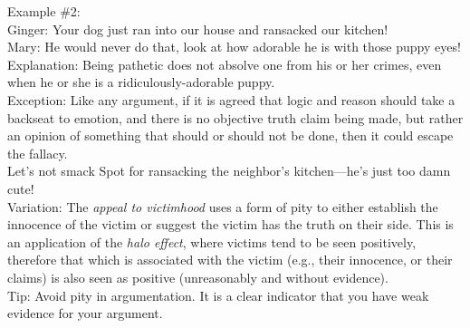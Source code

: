 \documentclass[a4paper,12pt,single,pdftex]{scrartcl}
\begin{document}
    
      Example \#2:
    \\

    
      Ginger: Your dog just ran into our house and ransacked our kitchen!
    \\

    
      Mary: He would never do that, look at how adorable he is with those puppy eyes!
    \\

    
      Explanation: Being pathetic does not absolve one from his or her crimes, even when he or she is a ridiculously-adorable puppy.
    \\

    
      Exception: Like any argument, if it is agreed that logic and reason should take a backseat to emotion, and there is no objective truth claim being made, but rather an opinion of something that should or should not be done, then it could escape the fallacy.
    \\

    
      Let's not smack Spot for ransacking the neighbor's kitchen—he's just too damn cute!
    \\

    
      Variation: The {\em appeal to victimhood} uses a form of pity to either establish the innocence of the victim or suggest the victim has the truth on their side. This is an application of the {\em halo effect}, where victims tend to be seen positively, therefore that which is associated with the victim (e.g., their innocence, or their claims) is also seen as positive (unreasonably and without evidence).
    \\

    
      Tip: Avoid pity in argumentation.  It is a clear indicator that you have weak evidence for your argument.
    \\

  
\end{document}
